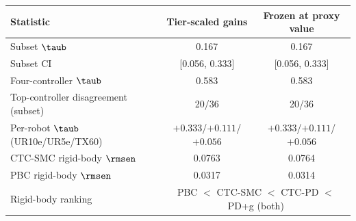 \begin{tabular}{lcc}
\toprule
Statistic & Tier-scaled gains & Frozen at proxy value \\
\midrule
Subset $\taub$ & 0.167 & 0.167 \\
Subset CI & [0.056, 0.333] & [0.056, 0.333] \\
Four-controller $\taub$ & 0.583 & 0.583 \\
Top-controller disagreement (subset) & 20/36 & 20/36 \\
Per-robot $\taub$ (UR10e/UR5e/TX60) & $+0.333$/$+0.111$/$+0.056$ & $+0.333$/$+0.111$/$+0.056$ \\
\midrule
CTC-SMC rigid-body $\rmsen$ & 0.0763 & 0.0764 \\
PBC rigid-body $\rmsen$ & 0.0317 & 0.0314 \\
Rigid-body ranking & \multicolumn{2}{c}{PBC $<$ CTC-SMC $<$ CTC-PD $<$ PD+g (both)} \\
\bottomrule
\end{tabular}
